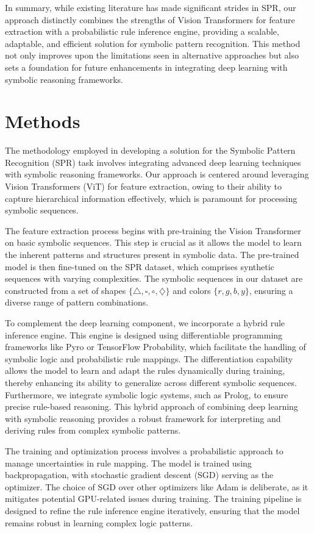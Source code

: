 \documentclass{article}
\begin{document}
In summary, while existing literature has made significant strides in SPR, our approach distinctly combines the strengths of Vision Transformers for feature extraction with a probabilistic rule inference engine, providing a scalable, adaptable, and efficient solution for symbolic pattern recognition. This method not only improves upon the limitations seen in alternative approaches but also sets a foundation for future enhancements in integrating deep learning with symbolic reasoning frameworks.

\section{Methods}
The methodology employed in developing a solution for the Symbolic Pattern Recognition (SPR) task involves integrating advanced deep learning techniques with symbolic reasoning frameworks. Our approach is centered around leveraging Vision Transformers (ViT) for feature extraction, owing to their ability to capture hierarchical information effectively, which is paramount for processing symbolic sequences.

The feature extraction process begins with pre-training the Vision Transformer on basic symbolic sequences. This step is crucial as it allows the model to learn the inherent patterns and structures present in symbolic data. The pre-trained model is then fine-tuned on the SPR dataset, which comprises synthetic sequences with varying complexities. The symbolic sequences in our dataset are constructed from a set of shapes \({\{\triangle, \square, \circ, \diamondsuit\}}\) and colors \({\{r, g, b, y\}}\), ensuring a diverse range of pattern combinations. 

To complement the deep learning component, we incorporate a hybrid rule inference engine. This engine is designed using differentiable programming frameworks like Pyro or TensorFlow Probability, which facilitate the handling of symbolic logic and probabilistic rule mappings. The differentiation capability allows the model to learn and adapt the rules dynamically during training, thereby enhancing its ability to generalize across different symbolic sequences. Furthermore, we integrate symbolic logic systems, such as Prolog, to ensure precise rule-based reasoning. This hybrid approach of combining deep learning with symbolic reasoning provides a robust framework for interpreting and deriving rules from complex symbolic patterns.

The training and optimization process involves a probabilistic approach to manage uncertainties in rule mapping. The model is trained using backpropagation, with stochastic gradient descent (SGD) serving as the optimizer. The choice of SGD over other optimizers like Adam is deliberate, as it mitigates potential GPU-related issues during training. The training pipeline is designed to refine the rule inference engine iteratively, ensuring that the model remains robust in learning complex logic patterns.
\end{document}
